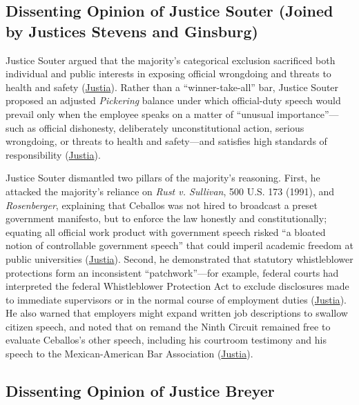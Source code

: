 \documentclass[12pt]{article}
\begin{document}
\subsection{Dissenting Opinion of Justice Souter (Joined by Justices Stevens and Ginsburg)}

Justice Souter argued that the majority's categorical exclusion sacrificed both individual and public interests in exposing official wrongdoing and threats to health and safety (\href{https://supreme.justia.com/cases/federal/us/547/410/}{Justia}). Rather than a ``winner-take-all'' bar, Justice Souter proposed an adjusted \textit{Pickering} balance under which official-duty speech would prevail only when the employee speaks on a matter of ``unusual importance''---such as official dishonesty, deliberately unconstitutional action, serious wrongdoing, or threats to health and safety---and satisfies high standards of responsibility (\href{https://supreme.justia.com/cases/federal/us/547/410/}{Justia}).

Justice Souter dismantled two pillars of the majority's reasoning. First, he attacked the majority's reliance on \textit{Rust v. Sullivan}, 500 U.S. 173 (1991), and \textit{Rosenberger}, explaining that Ceballos was not hired to broadcast a preset government manifesto, but to enforce the law honestly and constitutionally; equating all official work product with government speech risked ``a bloated notion of controllable government speech'' that could imperil academic freedom at public universities (\href{https://supreme.justia.com/cases/federal/us/547/410/}{Justia}). Second, he demonstrated that statutory whistleblower protections form an inconsistent ``patchwork''---for example, federal courts had interpreted the federal Whistleblower Protection Act to exclude disclosures made to immediate supervisors or in the normal course of employment duties (\href{https://supreme.justia.com/cases/federal/us/547/410/}{Justia}). He also warned that employers might expand written job descriptions to swallow citizen speech, and noted that on remand the Ninth Circuit remained free to evaluate Ceballos's other speech, including his courtroom testimony and his speech to the Mexican-American Bar Association (\href{https://supreme.justia.com/cases/federal/us/547/410/}{Justia}).

\subsection{Dissenting Opinion of Justice Breyer}
\end{document}
